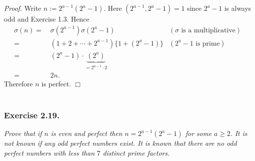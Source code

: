\documentclass{article}
\begin{document}
\emph{Proof.}
  Write $n := 2^{a-1}(2^a-1)$.
  Here $(2^{a-1}, 2^a - 1) = 1$ since $2^a - 1$ is always odd and Exercise 1.3.
  Hence
  \begin{align*}
    \sigma(n)
    =& \: \sigma(2^{a-1}) \sigma(2^a-1)
      &(\text{$\sigma$ is a multiplicative}) \\
    =& \: (1 + 2 + \cdots + 2^{a-1})\{1 + (2^a-1)\}
      &(\text{$2^a - 1$ is prime}) \\
    =& \: (2^a - 1) \cdot \underbrace{(2^a)}_{= 2^{a-1} \cdot 2} \\
    =& \: 2n.
  \end{align*}
  Therefore $n$ is perfect.
$\Box$ \\\\






\subsubsection*{Exercise 2.19.}
\emph{Prove that if $n$ is even and perfect then $n = 2^{a-1}(2^a-1)$ for some $a \geq 2$.
It is not known if any odd perfect numbers exist.
It is known that there are no odd perfect numbers with less than $7$ distinct prime factors.} \\
\end{document}
